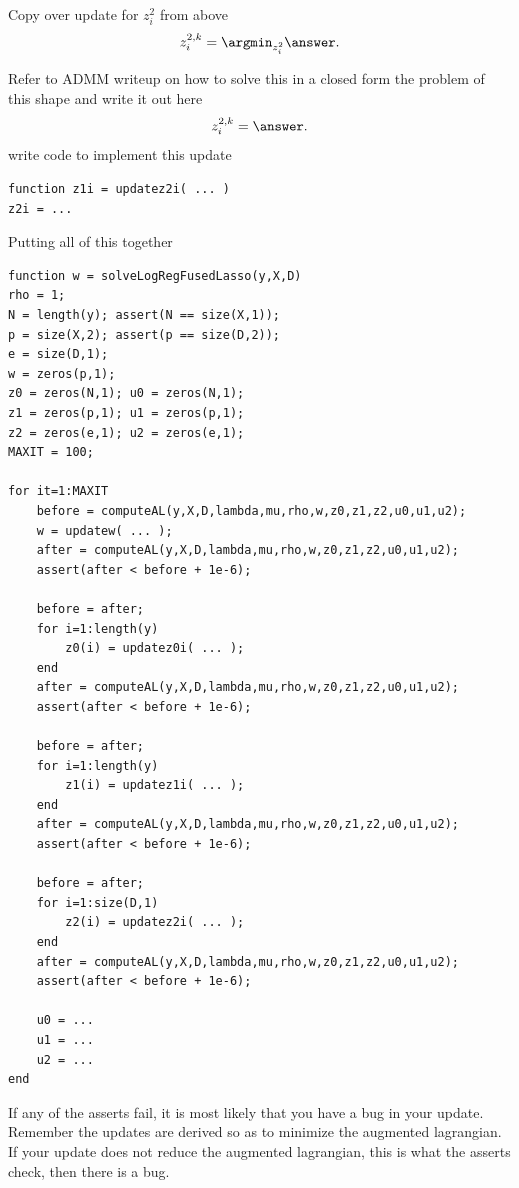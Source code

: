 \documentclass{article}
\begin{document}
{\newproblem{1pt} Copy over update for $z_i^2$ from above
\[
z_i^{2,k} = \argmin_{z_i^2}   \answer.
\]

Refer to ADMM writeup on how to solve this in a closed form the problem of this shape and write it out here
\[
z_i^{2,k} = \answer.
\]
write code to implement this update
\begin{verbatim}
function z1i = updatez2i( ... )
z2i = ...
\end{verbatim}
\newproblem{2pt} Putting all of this together
\begin{verbatim}
function w = solveLogRegFusedLasso(y,X,D)
rho = 1;
N = length(y); assert(N == size(X,1));
p = size(X,2); assert(p == size(D,2));
e = size(D,1);
w = zeros(p,1);
z0 = zeros(N,1); u0 = zeros(N,1);
z1 = zeros(p,1); u1 = zeros(p,1);
z2 = zeros(e,1); u2 = zeros(e,1);
MAXIT = 100;

for it=1:MAXIT
    before = computeAL(y,X,D,lambda,mu,rho,w,z0,z1,z2,u0,u1,u2);
    w = updatew( ... );
    after = computeAL(y,X,D,lambda,mu,rho,w,z0,z1,z2,u0,u1,u2);
    assert(after < before + 1e-6);

    before = after;
    for i=1:length(y)
        z0(i) = updatez0i( ... );
    end
    after = computeAL(y,X,D,lambda,mu,rho,w,z0,z1,z2,u0,u1,u2);
    assert(after < before + 1e-6);

    before = after;
    for i=1:length(y)
        z1(i) = updatez1i( ... );
    end
    after = computeAL(y,X,D,lambda,mu,rho,w,z0,z1,z2,u0,u1,u2);
    assert(after < before + 1e-6);

    before = after;
    for i=1:size(D,1)
        z2(i) = updatez2i( ... );
    end
    after = computeAL(y,X,D,lambda,mu,rho,w,z0,z1,z2,u0,u1,u2);
    assert(after < before + 1e-6);

    u0 = ...
    u1 = ...
    u2 = ...
end
\end{verbatim}
If any of the asserts fail, it is most likely that you have a bug in your update. Remember the updates are derived so as to minimize the augmented lagrangian. If your update does not reduce the augmented lagrangian, this is what the asserts check, then there is a bug.

}
\end{document}
